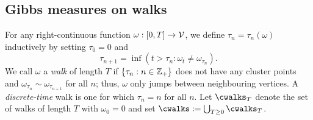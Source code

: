 
\subsection{Gibbs measures on walks}

For any right-continuous function $\omega : [0, T] \rightarrow \mathcal{V}$, we define
$\tau_n = \tau_n(\omega)$ inductively by setting $\tau_0 = 0$ and
\begin{equation}
\tau_{n+1} = \inf(t > \tau_n : \omega_t \ne \omega_{\tau_n}).
\end{equation}
We call $\omega$ a \emph{walk} of length $T$ if
$\{ \tau_n : n \in {\mathbb Z}_+ \}$ does not have any cluster points and
$\omega_{\tau_n} \sim \omega_{\tau_{n+1}}$ for all $n$; thus, $\omega$
only jumps between neighbouring vertices.
A \emph{discrete-time} walk is one for which $\tau_n = n$ for all $n$.
Let $\cwalks_T$ denote the set of walks of length $T$ with $\omega_0 = 0$
and set $\cwalks := \bigcup_{T \geq 0} \cwalks_T$.

